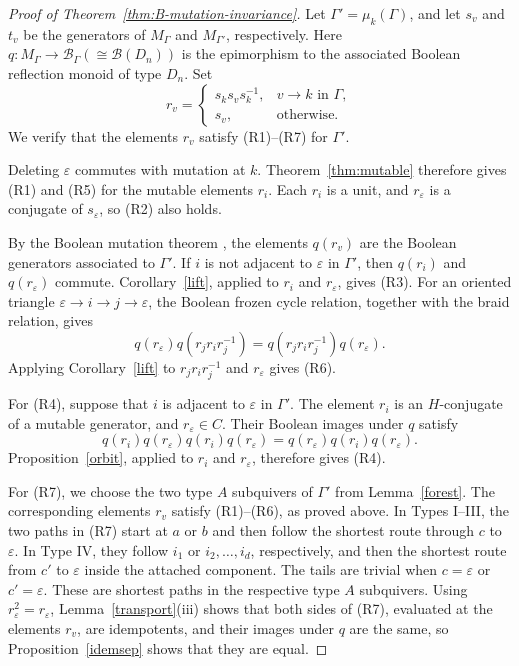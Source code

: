 \documentclass[a4paper, 12pt, reqno]{amsart}
\theoremstyle{definition}
\newcommand{\eps}{\varepsilon}
\newcommand{\Bool}{\mathcal B}
\begin{document}
\begin{proof}[Proof of Theorem~\ref{thm:B-mutation-invariance}]
Let $\Gamma'=\mu_k(\Gamma)$, and let $s_v$ and $t_v$ be the generators of $M_\Gamma$ and $M_{\Gamma'}$, respectively. Here $q:M_\Gamma\to \Bool_\Gamma (\cong \Bool(D_n))$ is the epimorphism to the associated Boolean reflection monoid of type $D_n$.
Set
\[
r_v=
\begin{cases}
s_ks_vs_k^{-1},&v\to k\text{ in }\Gamma,\\
s_v,&\text{otherwise}.
\end{cases}
\]
We verify that the elements $r_v$ satisfy (R1)--(R7) for $\Gamma'$.

Deleting $\eps$ commutes with mutation at $k$. Theorem~\ref{thm:mutable} therefore gives (R1) and (R5) for the mutable elements $r_i$. Each $r_i$ is a unit, and $r_\eps$ is a conjugate of $s_\eps$, so (R2) also holds.

By the Boolean mutation theorem \cite[Theorem 4.7 and Proposition 7.1]{DLL2020}, the elements $q(r_v)$ are the Boolean generators associated
to $\Gamma'$. If $i$ is not adjacent to $\eps$ in $\Gamma'$, then $q(r_i)$ and $q(r_\eps)$ commute. Corollary~\ref{lift}, applied to $r_i$ and $r_\eps$, gives (R3). For an oriented triangle $\eps\to i\to j\to\eps$, the Boolean frozen cycle relation, together with the braid relation, gives
\[
q(r_\eps)q(r_jr_ir_j^{-1})
=q(r_jr_ir_j^{-1})q(r_\eps).
\]
Applying Corollary~\ref{lift} to $r_jr_ir_j^{-1}$ and $r_\eps$ gives (R6).

For (R4), suppose that $i$ is adjacent to $\eps$ in $\Gamma'$. The element $r_i$ is an $H$-conjugate of a mutable generator, and $r_\eps\in C$.
Their Boolean images under $q$ satisfy
\[
q(r_i)q(r_\eps)q(r_i)q(r_\eps)
=q(r_\eps)q(r_i)q(r_\eps).
\]
Proposition~\ref{orbit}, applied to $r_i$ and $r_\eps$, therefore gives (R4).

For (R7), we choose the two type $A$ subquivers of $\Gamma'$ from Lemma~\ref{forest}. The corresponding elements $r_v$ satisfy (R1)--(R6), as
proved above. In Types I--III, the two paths in (R7) start at $a$ or $b$ and then follow the shortest route through $c$ to $\eps$. In Type IV, they follow $i_1$ or $i_2,\ldots,i_d$, respectively, and then the shortest route from $c'$ to $\eps$ inside the attached component. The tails are trivial when $c=\eps$ or $c'=\eps$. These are shortest paths in the respective type $A$ subquivers. Using $r_\eps^2=r_\eps$, Lemma~\ref{transport}(iii) shows that both sides of (R7), evaluated at the elements $r_v$, are idempotents, and their images under $q$ are the same, so Proposition~\ref{idemsep} shows that they are equal.


\end{proof}
\end{document}
